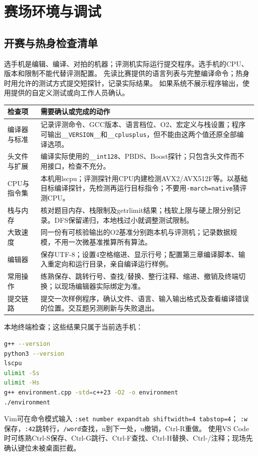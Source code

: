 \chapter{赛场环境与调试}
\section{开赛与热身检查清单}
选手机是编辑、编译、对拍的机器；评测机实际运行提交程序。选手机的CPU、版本和限制不能代替评测配置。
先读比赛提供的语言列表与完整编译命令；热身时用允许的测试方式提交短探针，记录实际结果。
如果系统不展示程序输出，使用提供的自定义测试或向工作人员确认。
\begin{longtable}{p{35mm}>{\raggedright\arraybackslash}p{124mm}}\toprule 检查项 & 需要确认或完成的动作\\\midrule\endhead
编译器与标准 & 记录评测命令、GCC版本、语言档位、O2、宏定义与栈设置；程序可输出\texttt{\_\_VERSION\_\_}和\texttt{\_\_cplusplus}，但不能由这两个值还原全部编译选项。\\
头文件与扩展 & 编译实际使用的\texttt{\_\_int128}、PBDS、Boost探针；只包含头文件而不用接口，检查不充分。\\
CPU与指令集 & 本机用lscpu；评测探针用CPU内建检测AVX2/AVX512F等。以基础目标编译探针，先检测再运行目标指令；不要用\texttt{-march=native}猜评测CPU。\\
栈与内存 & 核对题目内存、栈限制及getrlimit结果；栈软上限与硬上限分别记录。DFS保留递归，本地栈过小就调整测试限制。\\
大致速度 & 同一份有可核验输出的O2基准分别跑本机与评测机；记录数据规模，不用一次微基准推算所有算法。\\
编辑器 & 保存UTF-8；设置4空格缩进、显示行号；配置第三章编译脚本、输入重定向和运行目录，亲自编译运行样例。\\
常用操作 & 练熟保存、跳转行号、查找/替换、整行注释、缩进、撤销及终端切换；以现场编辑器实际绑定为准。\\
提交链路 & 提交一次样例程序，确认文件、语言、输入输出格式及查看编译错误的位置。交互题另测刷新与失败退出。\\\bottomrule
\end{longtable}
本地终端检查；这些结果只属于当前选手机：
\begin{lstlisting}[language=bash]
g++ --version
python3 --version
lscpu
ulimit -Ss
ulimit -Hs
g++ environment.cpp -std=c++23 -O2 -o environment
./environment
\end{lstlisting}
Vim可在命令模式输入 \texttt{:set number expandtab shiftwidth=4 tabstop=4}；
\texttt{:w}保存，\texttt{:42}跳转行，\texttt{/word}查找，n到下一处，u撤销，Ctrl-R重做。
使用VS Code时可练熟Ctrl-S保存、Ctrl-G跳行、Ctrl-F查找、Ctrl-H替换、Ctrl-/注释；现场先确认键位未被桌面拦截。

